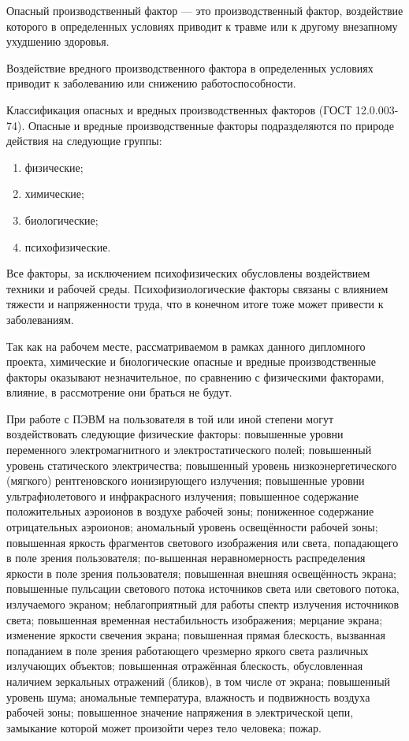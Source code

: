 Опасный производственный фактор --- это производственный фактор, воздействие которого в определенных условиях приводит к травме или к другому внезапному ухудшению здоровья. 

Воздействие вредного производственного фактора в определенных условиях приводит к заболеванию или снижению работоспособности.

Классификация опасных и вредных производственных факторов (ГОСТ 12.0.003-74).
Опасные и вредные производственные факторы подразделяются по природе действия на следующие группы:

\begin{enumerate}
	\item физические;
	\item химические;
	\item биологические;
	\item психофизические.
\end{enumerate}

Все факторы, за исключением психофизических обусловлены воздействием техники и рабочей среды.
Психофизиологические факторы связаны с влиянием тяжести и напряженности труда, что в конечном итоге тоже может привести к заболеваниям.

Так как на рабочем месте, рассматриваемом в рамках данного дипломного проекта, химические и биологические опасные и вредные производственные факторы оказывают незначительное, по сравнению с  физическими факторами, влияние, в рассмотрение они браться не будут.

При работе с ПЭВМ на пользователя в той или иной степени могут воздействовать следующие физические факторы: повышенные уровни переменного электромагнитного и электростатического полей; повышенный уровень статического электричества; повышенный уровень низкоэнергетического (мягкого) рентгеновского ионизирующего излучения; повышенные уровни ультрафиолетового и инфракрасного излучения; повышенное содержание положительных аэроионов в воздухе рабочей зоны; пониженное содержание отрицательных аэроионов; аномальный уровень освещённости рабочей зоны; повышенная яркость фрагментов светового изображения или света, попадающего в поле зрения пользователя; по-вышенная неравномерность распределения яркости в поле зрения пользователя; повышенная внешняя освещённость экрана; повышенные пульсации светового потока источников света или светового потока, излучаемого экраном; неблагоприятный для работы спектр излучения источников света; повышенная временная нестабильность изображения; мерцание экрана; изменение яркости свечения экрана; повышенная прямая блескость, вызванная попаданием в поле зрения работающего чрезмерно яркого света различных излучающих объектов; повышенная отражённая блескость, обусловленная наличием зеркальных отражений (бликов), в том числе от экрана; повышенный уровень шума; аномальные температура, влажность и подвижность воздуха рабочей зоны; повышенное значение напряжения в электрической цепи, замыкание которой может произойти через тело человека; пожар.

